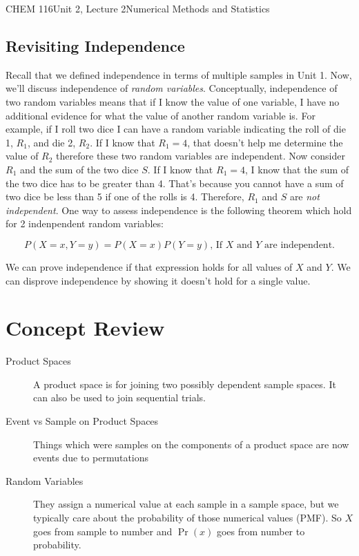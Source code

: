 \documentclass{article}
\begin{document}
\begin{tdoc}{CHEM 116}{Unit 2, Lecture 2}{Numerical Methods and Statistics}
\subsection{Revisiting Independence}

Recall that we defined independence in terms of multiple samples in Unit 1. Now, we'll discuss independence of \textit{random variables}. Conceptually, independence of two random variables means that if I know the value of one variable, I have no additional evidence for what the value of another random variable is. For example, if I roll two dice I can have a random variable indicating the roll of die 1, $R_1$, and die 2, $R_2$. If I know that $R_1 = 4$, that doesn't help me determine the value of $R_2$ therefore these two random variables are independent. Now consider $R_1$ and the sum of the two dice $S$. If I know that $R_1 = 4$, I know that the sum of the two dice has to be greater than 4. That's because you cannot have a sum of two dice be less than 5 if one of the rolls is 4. Therefore, $R_1$ and $S$ are \textit{not independent}. One way to assess independence is the following theorem which hold for 2 indenpendent random variables:

\begin{equation}
P(X = x, Y = y) = P(X = x) P(Y = y),\, \textrm{If } X \textrm{ and } Y \textrm{ are independent.}
\end{equation}

We can prove independence if that expression holds for all values of $X$ and $Y$. We can disprove independence by showing it doesn't hold for a single value.

\section{Concept Review}

\begin{description}

\item[Product Spaces] A product space is for joining two possibly
  dependent sample spaces. It can also be used to join sequential trials.

\item[Event vs Sample on Product Spaces] Things which were samples on
  the components of a product space are now events due to permutations

\item[Random Variables] They assign a numerical value at each sample
  in a sample space, but we typically care about the probability of
  those numerical values (PMF). So $X$ goes from sample to number and
  $\Pr(x)$ goes from number to probability.


\end{description}
\end{tdoc}
\end{document}
